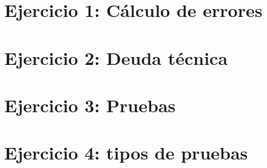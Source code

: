 

\section{Ejercicio 1: Cálculo de errores}\label{sec:ejercicio-1:-calculo-de-errores}



\section{Ejercicio 2: Deuda técnica}\label{sec:ejercicio-2:-deuda-tecnica}



\section{Ejercicio 3: Pruebas}\label{sec:ejercicio-3:-pruebas}



\section{Ejercicio 4: tipos de pruebas}\label{sec:ejercicio-4:-tipos-de-pruebas}

